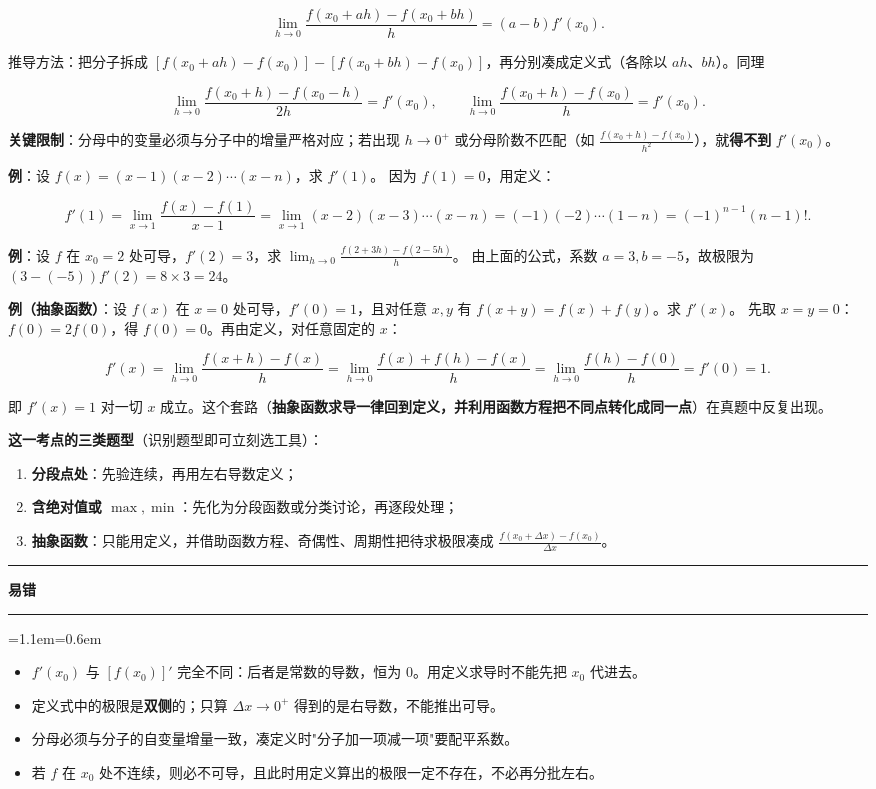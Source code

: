 \documentclass[11pt,openany,UTF8]{ctexbook}
\newcommand{\callouthead}[2]{%
  \par\addvspace{7pt}\noindent
  {\color{#1}\rule[-0.15em]{3pt}{1.05em}}\hspace{0.5em}%
  {\bfseries\color{#1}#2}\par\nobreak\vspace{-0.35em}%
  {\color{rulesep}\hrule height 0.4pt}\nobreak\vspace{0.45em}%
  \begingroup\small\setlength{\parindent}{0pt}%
  \leftskip=1.1em\rightskip=0.6em\noindent\ignorespaces}
\newcommand{\calloutend}{\par\endgroup\addvspace{7pt}}
\newenvironment{callwarn}[1]{\callouthead{warnbar}{#1}}{\calloutend}
\begin{document}
\[\lim_{h\to 0}\frac{f(x_0+ah)-f(x_0+bh)}{h}=(a-b)f'(x_0).\]

推导方法：把分子拆成 $[f(x_0+ah)-f(x_0)]-[f(x_0+bh)-f(x_0)]$，再分别凑成定义式（各除以 $ah$、$bh$）。同理

\[\lim_{h\to 0}\frac{f(x_0+h)-f(x_0-h)}{2h}=f'(x_0),\qquad
\lim_{h\to 0}\frac{f(x_0+h)-f(x_0)}{h}=f'(x_0).\]

\textbf{关键限制}：分母中的变量必须与分子中的增量严格对应；若出现 $h\to 0^+$ 或分母阶数不匹配（如 $\frac{f(x_0+h)-f(x_0)}{h^2}$），就\textbf{得不到} $f'(x_0)$。

\textbf{例}：设 $f(x)=(x-1)(x-2)\cdots(x-n)$，求 $f'(1)$。 因为 $f(1)=0$，用定义：

\[f'(1)=\lim_{x\to 1}\frac{f(x)-f(1)}{x-1}
=\lim_{x\to 1}(x-2)(x-3)\cdots(x-n)=(-1)(-2)\cdots(1-n)=(-1)^{n-1}(n-1)!.\]

\textbf{例}：设 $f$ 在 $x_0=2$ 处可导，$f'(2)=3$，求 $\lim_{h\to 0}\frac{f(2+3h)-f(2-5h)}{h}$。 由上面的公式，系数 $a=3,b=-5$，故极限为 $(3-(-5))f'(2)=8\times 3=24$。

\textbf{例（抽象函数）}：设 $f(x)$ 在 $x=0$ 处可导，$f'(0)=1$，且对任意 $x,y$ 有 $f(x+y)=f(x)+f(y)$。求 $f'(x)$。 先取 $x=y=0$：$f(0)=2f(0)$，得 $f(0)=0$。再由定义，对任意固定的 $x$：

\[f'(x)=\lim_{h\to 0}\frac{f(x+h)-f(x)}{h}=\lim_{h\to 0}\frac{f(x)+f(h)-f(x)}{h}=\lim_{h\to 0}\frac{f(h)-f(0)}{h}=f'(0)=1.\]

即 $f'(x)=1$ 对一切 $x$ 成立。这个套路（\textbf{抽象函数求导一律回到定义，并利用函数方程把不同点转化成同一点}）在真题中反复出现。

\textbf{这一考点的三类题型}（识别题型即可立刻选工具）：

\begin{enumerate}
\item \textbf{分段点处}：先验连续，再用左右导数定义；
\item \textbf{含绝对值或 $\max,\min$}：先化为分段函数或分类讨论，再逐段处理；
\item \textbf{抽象函数}：只能用定义，并借助函数方程、奇偶性、周期性把待求极限凑成 $\frac{f(x_0+\Delta x)-f(x_0)}{\Delta x}$。
\end{enumerate}
\begin{callwarn}{易错}
\begin{itemize}
\item $f'(x_0)$ 与 $[f(x_0)]'$ 完全不同：后者是常数的导数，恒为 $0$。用定义求导时不能先把 $x_0$ 代进去。
\item 定义式中的极限是\textbf{双侧}的；只算 $\Delta x\to 0^+$ 得到的是右导数，不能推出可导。
\item 分母必须与分子的自变量增量一致，凑定义时"分子加一项减一项"要配平系数。
\item 若 $f$ 在 $x_0$ 处不连续，则必不可导，且此时用定义算出的极限一定不存在，不必再分批左右。
\end{itemize}
\end{callwarn}
\end{document}
